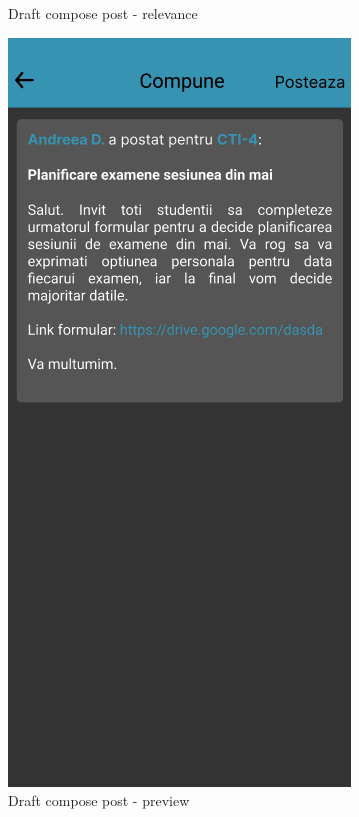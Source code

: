 \begin{figure}[!ht]
\begin{minipage}[b]{0.32\textwidth}
        \caption{Draft compose post - relevance}
        \label{4:fig:draft-create-post-target}
    \end{minipage}
    \hfill
    \begin{minipage}[b]{0.32\textwidth}
        \captionsetup{justification=centering}
        \includegraphics[width=\textwidth]{figures/app/initial/compose-step-3-draft.png}
        \caption{Draft compose post - preview}
        \label{4:fig:draft-create-post-preview}
    \end{minipage}
\end{figure}


